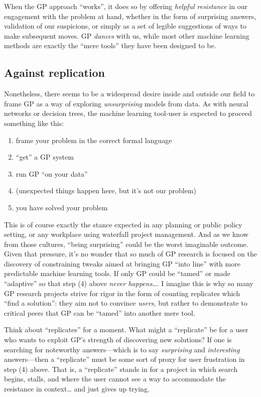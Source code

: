 When the GP approach ``works'', it does so by offering \emph{helpful resistance} in our engagement with the problem at hand, whether in the form of surprising answers, validation of our suspicions, or simply as a set of legible suggestions of ways to make subsequent moves. GP \emph{dances} with us, while most other machine learning methods are exactly the ``mere tools'' they have been designed to be.

\subsection{Against replication}\hypertarget{against-replication}{}\label{against-replication}

Nonetheless, there seems to be a widespread desire inside and outside our field to frame GP as a way of exploring \emph{unsurprising} models from data. As with neural networks or decision trees, the machine learning tool-user is expected to proceed something like this:

\begin{enumerate}
\item frame your problem in the correct formal language
\item ``get'' a GP system
\item run GP ``on your data''
\item (unexpected things happen here, but it's not our problem)
\item you have solved your problem
\end{enumerate}

This is of course exactly the stance expected in any planning or public policy setting, or any workplace using waterfall project management. And as we know from those cultures, ``being surprising'' could be the worst imaginable outcome. 
Given that pressure, it's no wonder that so much of GP research is focused on the discovery of constraining tweaks aimed at bringing GP ``into line'' with more predictable machine learning tools. If only GP could be ``tamed'' or made ``adaptive'' so that step (4) above \emph{never happens}\ldots{}. I imagine this is why so many GP research projects strive for rigor in the form of counting replicates which ``find a solution'': they aim not to convince \emph{users}, but rather to demonstrate to critical peers that GP can be ``tamed'' into another mere tool.

Think about ``replicates'' for a moment. What might a ``replicate'' be for a user who wants to exploit GP's strength of discovering new solutions? If one is searching for noteworthy answers---which is to say \emph{surprising} and \emph{interesting} answers---then a ``replicate'' must be some sort of proxy for user frustration in step (4) above. That is, a ``replicate'' stands in for a project in which search begins, stalls, and where the user cannot see a way to accommodate the resistance in context\ldots{} and just gives up trying.

